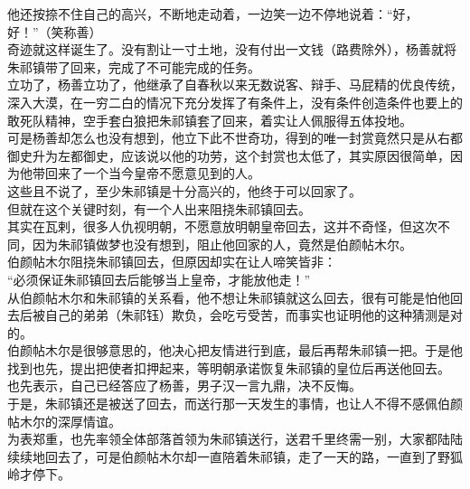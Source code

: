 \begin{multicols}{\theparacolNo}
他还按捺不住自己的高兴，不断地走动着，一边笑一边不停地说着：“好，好！”（笑称善）\\

奇迹就这样诞生了。没有割让一寸土地，没有付出一文钱（路费除外），杨善就将朱祁镇带了回来，完成了不可能完成的任务。\\

立功了，杨善立功了，他继承了自春秋以来无数说客、辩手、马屁精的优良传统，深入大漠，在一穷二白的情况下充分发挥了有条件上，没有条件创造条件也要上的敢死队精神，空手套白狼把朱祁镇套了回来，着实让人佩服得五体投地。\\

可是杨善却怎么也没有想到，他立下此不世奇功，得到的唯一封赏竟然只是从右都御史升为左都御史，应该说以他的功劳，这个封赏也太低了，其实原因很简单，因为他带回来了一个当今皇帝不愿意见到的人。\\

这些且不说了，至少朱祁镇是十分高兴的，他终于可以回家了。\\

但就在这个关键时刻，有一个人出来阻挠朱祁镇回去。\\

其实在瓦剌，很多人仇视明朝，不愿意放明朝皇帝回去，这并不奇怪，但这次不同，因为朱祁镇做梦也没有想到，阻止他回家的人，竟然是伯颜帖木尔。\\

伯颜帖木尔阻挠朱祁镇回去，但原因却实在让人啼笑皆非：\\

“必须保证朱祁镇回去后能够当上皇帝，才能放他走！”\\

从伯颜帖木尔和朱祁镇的关系看，他不想让朱祁镇就这么回去，很有可能是怕他回去后被自己的弟弟（朱祁钰）欺负，会吃亏受苦，而事实也证明他的这种猜测是对的。\\

伯颜帖木尔是很够意思的，他决心把友情进行到底，最后再帮朱祁镇一把。于是他找到也先，提出把使者扣押起来，等明朝承诺恢复朱祁镇的皇位后再送他回去。\\

也先表示，自己已经答应了杨善，男子汉一言九鼎，决不反悔。\\

于是，朱祁镇还是被送了回去，而送行那一天发生的事情，也让人不得不感佩伯颜帖木尔的深厚情谊。\\

为表郑重，也先率领全体部落首领为朱祁镇送行，送君千里终需一别，大家都陆陆续续地回去了，可是伯颜帖木尔却一直陪着朱祁镇，走了一天的路，一直到了野狐岭才停下。\\


\end{multicols}
